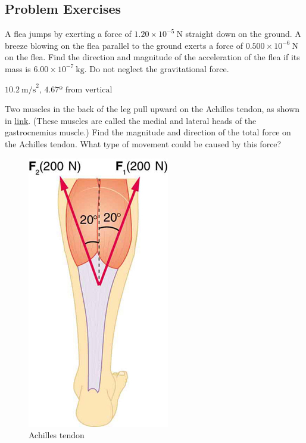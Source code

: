 \documentclass[
]{book}
\newenvironment{problems-exercises}{}{}
\begin{document}
\hypertarget{fs-id2678901}{}
\begin{problems-exercises}

\hypertarget{problem-exercises-4}{%
\subsection{Problem Exercises}\label{problem-exercises-4}}

\hypertarget{fs-id2391286}{}
\leavevmode\hypertarget{fs-id2391288}{}%
A flea jumps by exerting a force of
\({1\text{.}{\text{20} \times \text{10}^{- 5}}\ \text{N}}{}\) straight
down on the ground. A breeze blowing on the flea parallel to the ground
exerts a force of
\({0\text{.}{\text{500} \times \text{10}^{- 6}}\ \text{N}}{}\) on the
flea. Find the direction and magnitude of the acceleration of the flea
if its mass is
\({6\text{.}{\text{00} \times \text{10}^{- 7}}\ \text{kg}}{}\). Do not
neglect the gravitational force.

\leavevmode\hypertarget{fs-id1487097}{}%
\(\text{10.2}\ \text{m/s}^{2}\text{,\ 4.67º\ from\ vertical}\)

\hypertarget{fs-id1427030}{}
\leavevmode\hypertarget{fs-id2616590}{}%
Two muscles in the back of the leg pull upward on the Achilles tendon,
as shown in \protect\hyperlink{import-auto-id2667995}{link}.
(These muscles are called the medial and lateral heads of the
gastrocnemius muscle.) Find the magnitude and direction of the total
force on the Achilles tendon. What type of movement could be caused by
this force?

\begin{figure}
\hypertarget{import-auto-id2667995}{%
\centering
\includegraphics{images/Figure_04_07_04.jpg}
\caption{Achilles tendon}\label{import-auto-id2667995}
}
\end{figure}


\end{problems-exercises}
\end{document}
